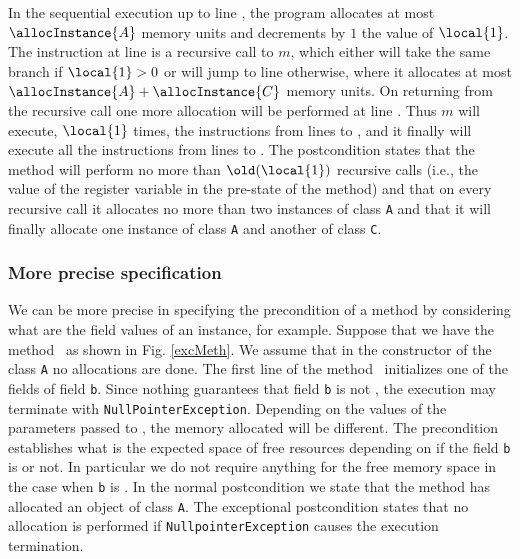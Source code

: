 In the sequential execution up to line , the program allocates at most $\allocInstance{A}$ memory units and decrements by $1$ the value of $\local{1}$. The instruction at line  is a recursive call to $m$, which either will take the same branch if $\local{1} > 0 $ or will jump to line  otherwise, where it allocates at most $\allocInstance{A} +  \allocInstance{C}$ memory units. On returning from the recursive call one more allocation will be performed at line .
 Thus $m$ will execute, $\local{1}$ times, the instructions from lines  to ,  and it finally will execute all the instructions from lines   to .
The postcondition states that the method will perform no more
than $\old(\local{1})$ recursive calls (i.e., the value of the register variable in the pre-state of the method) and that on every recursive call it allocates no more than two instances of class \texttt{A} and that it will finally allocate one instance of class \texttt{A} and another of class \texttt{C}.


\subsubsection{More precise specification} We can be more precise in specifying the precondition of a method by considering what are the field values of an instance, for example. Suppose that we have the method \method\ as shown in Fig. \ref{excMeth}. We assume that in the constructor of the class \texttt{A} no allocations are done. The first line of the method \method\ initializes one of the fields of field \texttt{b}. Since nothing guarantees that field \texttt{b} is not \Mynull, the execution may terminate with
\texttt{NullPointerException}. Depending on the values of the parameters passed to \method, the memory allocated will be different. The precondition establishes what is the expected space of free resources depending on if the field
\texttt{b} is \Mynull  or not. In particular we do not require anything for
the free memory space in the case when \texttt{b} is \Mynull. In the
normal postcondition we state that the method has allocated an
object of class \texttt{A}. The exceptional postcondition states
that no allocation is performed if \texttt{NullpointerException} causes the execution termination.

